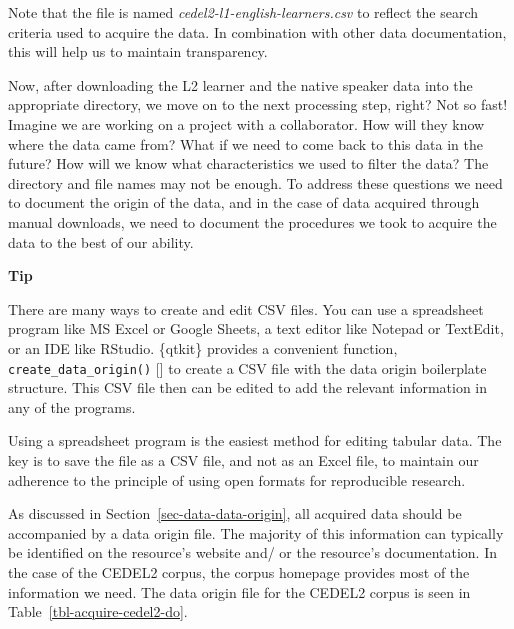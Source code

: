 \documentclass[
  letterpaper,
  krantz1]{latex/krantz-mod}
\newcommand{\cindex}[1]{%
  \StrSubstitute{#1}{_}{\_}[\temp]%
  \index{\temp}%
}
\theoremstyle{definition}
\theoremstyle{definition}
\theoremstyle{remark}
\begin{document}
Note that the file is named \emph{cedel2-l1-english-learners.csv} to
reflect the search criteria used to acquire the data. In combination
with other data documentation, this will help us to maintain
transparency.

Now, after downloading the L2 learner and the native speaker data into
the appropriate directory, we move on to the next processing step,
right? Not so fast! Imagine we are working on a project with a
collaborator. How will they know where the data came from? What if we
need to come back to this data in the future? How will we know what
characteristics we used to filter the data? The directory and file names
may not be enough. To address these questions we need to document the
origin of the data, and in the case of data acquired
through manual downloads, we need to document the procedures we took to
acquire the data to the best of our ability.

\begin{tcolorbox}[enhanced jigsaw, toprule=.15mm, breakable, colback=white, arc=.35mm, left=2mm, colframe=quarto-callout-color-frame, opacityback=0, bottomrule=.15mm, rightrule=.15mm, leftrule=.75mm]

\textbf{ Tip}

There are many ways to create and edit CSV files. You can use a
spreadsheet program like MS Excel or Google Sheets, a text editor like
Notepad or TextEdit, or an IDE like
RStudio.
\{qtkit\} provides a convenient function,
\texttt{create\_data\_origin()}\cindex{create_data_origin()} to create a
CSV file with the data origin boilerplate structure. This CSV file then
can be edited to add the relevant information in any of the programs.

Using a spreadsheet program is the easiest method for editing tabular
data. The key is to save the file as a CSV file, and not as an Excel
file, to maintain our adherence to the principle of using open formats
for reproducible research.

\end{tcolorbox}

As discussed in Section~\ref{sec-data-data-origin}, all acquired data
should be accompanied by a data origin file. The
majority of this information can typically be identified on the
resource's website and/ or the resource's documentation. In the case of
the CEDEL2 corpus, the corpus homepage provides most of the information
we need. The data origin file for the CEDEL2 corpus is seen in
Table~\ref{tbl-acquire-cedel2-do}.
\end{document}
